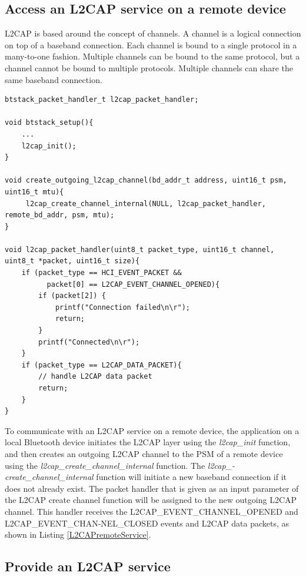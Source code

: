 \documentclass[a4paper,titlepage,oneside,12pt]{amsart} %
\begin{document}
\subsection{Access an L2CAP service on a remote device}
L2CAP is based around the concept of channels. A channel is a logical connection on top of a baseband connection. Each channel is bound to a single protocol in a many-to-one fashion. Multiple channels can be bound to the same protocol, but a channel cannot be bound to multiple protocols. Multiple channels can share the same baseband connection.

\begin{lstlisting}[caption=L2CAP handler for outgoing L2CAP channel.,label=L2CAPremoteService]
btstack_packet_handler_t l2cap_packet_handler;

void btstack_setup(){
    ...
    l2cap_init();
}

void create_outgoing_l2cap_channel(bd_addr_t address, uint16_t psm, uint16_t mtu){
     l2cap_create_channel_internal(NULL, l2cap_packet_handler, remote_bd_addr, psm, mtu);
}

void l2cap_packet_handler(uint8_t packet_type, uint16_t channel, uint8_t *packet, uint16_t size){
    if (packet_type == HCI_EVENT_PACKET &&
          packet[0] == L2CAP_EVENT_CHANNEL_OPENED){
        if (packet[2]) {
            printf("Connection failed\n\r");
            return;
        }
        printf("Connected\n\r");
    }
    if (packet_type == L2CAP_DATA_PACKET){
        // handle L2CAP data packet
        return;
    }
}
\end{lstlisting}


To communicate with an L2CAP service on a remote device, the application on a local Bluetooth device initiates the L2CAP layer using the \emph{l2cap\_init} function, and then creates an outgoing L2CAP channel to the PSM of a remote device using the \emph{l2cap\_create\_channel\_internal} function. The  \emph{l2cap\_-create\_channel\_internal} function will initiate a new baseband connection if it does not already exist. The packet handler that is given as an input parameter of the L2CAP create channel function will be assigned to the new outgoing L2CAP channel. This handler receives the L2CAP\_EVENT\_CHANNEL\_OPENED and L2CAP\_EVENT\_CHAN-NEL\_CLOSED events and L2CAP data packets, as shown in Listing \ref{L2CAPremoteService}.


\subsection{Provide an L2CAP service}
\end{document}
